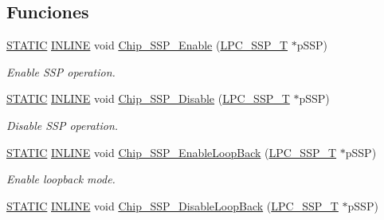 \subsection*{Funciones}
\begin{DoxyCompactItemize}
\item 
\hyperlink{group___l_p_c___types___public___macros_ga10b2d890d871e1489bb02b7e70d9bdfb}{S\+T\+A\+T\+IC} \hyperlink{spifi__18xx__43xx_8h_a2eb6f9e0395b47b8d5e3eeae4fe0c116}{I\+N\+L\+I\+NE} void \hyperlink{group___s_s_p__18_x_x__43_x_x_gaf49b9a4689c9ae39bbd8c1ac20d31073}{Chip\+\_\+\+S\+S\+P\+\_\+\+Enable} (\hyperlink{struct_l_p_c___s_s_p___t}{L\+P\+C\+\_\+\+S\+S\+P\+\_\+T} $\ast$p\+S\+SP)
\begin{DoxyCompactList}\small\item\em Enable S\+SP operation. \end{DoxyCompactList}\item 
\hyperlink{group___l_p_c___types___public___macros_ga10b2d890d871e1489bb02b7e70d9bdfb}{S\+T\+A\+T\+IC} \hyperlink{spifi__18xx__43xx_8h_a2eb6f9e0395b47b8d5e3eeae4fe0c116}{I\+N\+L\+I\+NE} void \hyperlink{group___s_s_p__18_x_x__43_x_x_ga3033c296868595a01dd74ecccaed6090}{Chip\+\_\+\+S\+S\+P\+\_\+\+Disable} (\hyperlink{struct_l_p_c___s_s_p___t}{L\+P\+C\+\_\+\+S\+S\+P\+\_\+T} $\ast$p\+S\+SP)
\begin{DoxyCompactList}\small\item\em Disable S\+SP operation. \end{DoxyCompactList}\item 
\hyperlink{group___l_p_c___types___public___macros_ga10b2d890d871e1489bb02b7e70d9bdfb}{S\+T\+A\+T\+IC} \hyperlink{spifi__18xx__43xx_8h_a2eb6f9e0395b47b8d5e3eeae4fe0c116}{I\+N\+L\+I\+NE} void \hyperlink{group___s_s_p__18_x_x__43_x_x_ga8683ccce6ba5578103efcb791f39cff8}{Chip\+\_\+\+S\+S\+P\+\_\+\+Enable\+Loop\+Back} (\hyperlink{struct_l_p_c___s_s_p___t}{L\+P\+C\+\_\+\+S\+S\+P\+\_\+T} $\ast$p\+S\+SP)
\begin{DoxyCompactList}\small\item\em Enable loopback mode. \end{DoxyCompactList}\item 
\hyperlink{group___l_p_c___types___public___macros_ga10b2d890d871e1489bb02b7e70d9bdfb}{S\+T\+A\+T\+IC} \hyperlink{spifi__18xx__43xx_8h_a2eb6f9e0395b47b8d5e3eeae4fe0c116}{I\+N\+L\+I\+NE} void \hyperlink{group___s_s_p__18_x_x__43_x_x_gaa733ed4b0773cda022ad87ff41304c40}{Chip\+\_\+\+S\+S\+P\+\_\+\+Disable\+Loop\+Back} (\hyperlink{struct_l_p_c___s_s_p___t}{L\+P\+C\+\_\+\+S\+S\+P\+\_\+T} $\ast$p\+S\+SP)

\end{DoxyCompactItemize}
